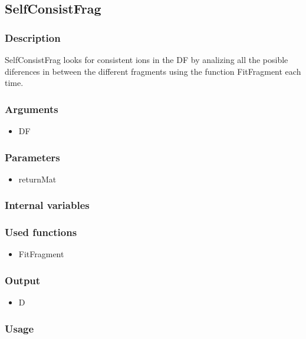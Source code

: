 \subsection{SelfConsistFrag}
\subsubsection{Description}
SelfConsistFrag looks for consistent ions in the DF by analizing all the posible diferences in between the different fragments using the function FitFragment each time.
\subsubsection{Arguments}
\begin{itemize}
\item DF
\end{itemize}
\subsubsection{Parameters}
\begin{itemize}
\item returnMat
\end{itemize}
\subsubsection{Internal variables}
\subsubsection{Used functions}
\begin{itemize}
\item FitFragment
\end{itemize}
\subsubsection{Output}
\begin{itemize}
\item D %
\end{itemize}
\subsubsection{Usage}


